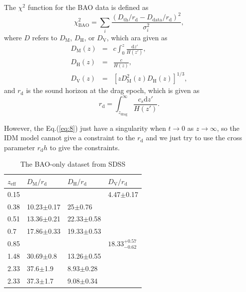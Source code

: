 \documentclass[twocolumn]{aastex631}
\begin{document}
   The $\chi^2$ function for the BAO data is defined as
   \begin{equation}
      \chi_{\text{BAO}}^2=\sum_i\frac{(D_{\text{th}}/r_{\text{d}}-D_{\text{data}}/r_{\text{d}})^2}{\sigma_i^2},
   \end{equation}
   where $D$ refers to $D_{\text{M}}$, $D_{\text{H}}$, or $D_{\text{V}}$, which ara given as
   \begin{eqnarray}
      D_{\text{M}}(z)&=&c\int_0^z\frac{\text{d}z'}{H(z')},\\
      D_{\text{H}}(z)&=&\frac{c}{H(z)},\\
      D_{\text{V}}(z)&=&\left[zD_{\text{M}}^2(z)D_{\text{H}}(z)\right]^{1/3},
   \end{eqnarray}
   and $r_{\text{d}}$ is the sound horizon at the drag epoch, which is given as
   \begin{equation}
      r_{\text{d}}=\int_{z_{\text{drag}}}^{\infty}\frac{c_s\text{d}z'}{H(z')}.
   \end{equation}

   However, the Eq.(\ref{eq:8}) just have a singularity when $t\to 0$ as $z\to\infty$,
   so the IDM model cannot give a constraint to the $r_{\text{d}}$ and we just try to use the cross
   parameter $r_{\text{d}}h$ to give the constraints.

   \begin{table}[htbp]
      \caption{The BAO-only dataset from SDSS}
      \centering
      \begin{tabular}{llll}
         \hline\hline
         $z_{\text{eff}}$ & $D_{\text{M}}/r_{\text{d}}$ & $D_{\text{H}}/r_{\text{d}}$ & $D_{\text{V}}/r_{\text{d}}$ \\
         \hline
         0.15 & & & 4.47$\pm$0.17 \\
         0.38 & 10.23$\pm$0.17 & 25$\pm$0.76 & \\
         0.51 & 13.36$\pm$0.21 & 22.33$\pm$0.58 & \\
         0.7 & 17.86$\pm$0.33 & 19.33$\pm$0.53 & \\
         0.85 & & & $18.33_{-0.62}^{+0.57}$ \\
         1.48 & 30.69$\pm$0.8 & 13.26$\pm$0.55 & \\
         2.33 & 37.6$\pm$1.9 & 8.93$\pm$0.28 & \\
         2.33 & 37.3$\pm$1.7 & 9.08$\pm$0.34 & \\
         \hline
      \end{tabular}
      \label{tab:2}
   \end{table}
\end{document}

